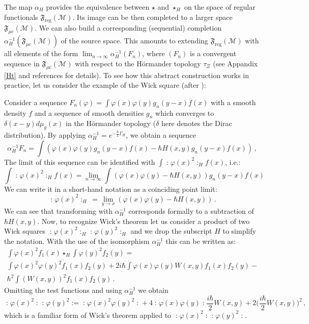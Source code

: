 \documentclass[12pt]{article}
\newcommand{\F}{\mathfrak{F}}
\newcommand{\Mcal}{\mathcal{M}}
\newcommand{\reg}{\mathrm{reg}}
\newcommand{\mc}{{\mu\mathrm{c}}}
\newcommand{\al}{\alpha}
\newcommand{\ph}{\varphi}
\newcommand{\1}{\mathds{1}}                         %
\begin{document}
{{The map $\al_H$ provides the equivalence between $\star$ and $\star_H$ on the space of regular functionals $\F_\reg(\Mcal)$. Its image can be then completed to a larger space $\F_\mc(\Mcal)$. We can also build a corresponding (sequential) completion $\al_H^{-1}(\F_\mc(\Mcal))$ of the source space. This amounts to extending  $\F_\reg(\Mcal)$ with all elements of the form $\lim_{n\rightarrow \infty}\al_H^{-1}(F_n)$, where $(F_n)$ is a convergent sequence in $\F_\mc(\Mcal)$ with respect to the H\"ormander topology $\tau_\Xi$ (see Appandix \ref{Ht} and references \cite{BDF,BaerF,Hoer1} for details). To see how this abstract construction works in practice, let us consider the example of the Wick square (after \cite{FR12}):
 \begin{exa}\label{Wick}
Consider a sequence $F_n(\ph)=\int \ph(x)\ph(y)g_n(y-x)f(x)$ with a smooth density $f$ and a sequence of smooth densities $g_n$ which converges to $\delta(x-y) d\mu_g(x)$ in the H\"ormander topology ($\delta$ here denotes the Dirac distribution). By applying $\al_H^{-1}=e^{-\tfrac{\hbar}{2}\Gamma_H}$, we obtain a sequence 
\[
\al_H^{-1}F_n= \int (\ph(x)\ph(y)g_n(y-x)f(x)-\hbar H(x,y)g_n(y-x)f(x))\,,
\]
The limit of this sequence can be identified with $\int \mathopen:\ph(x)^2\mathclose:_Hf(x)$, i.e.:
\[
\int \mathopen:\ph(x)^2\mathclose:_Hf(x)=\lim_{n\rightarrow\infty}\int (\ph(x)\ph(y)-\hbar H(x,y))g_n(y-x)f(x)
\]
We can write it in a short-hand notation as a coinciding point limit:
\[
\mathopen:\ph(x)^2\mathclose:_H\,=\lim_{y\rightarrow x}(\ph(x)\ph(y)-\hbar H(x,y))\,.
\]
 We can see that transforming with $\al_H^{-1}$ corresponds formally to a subtraction of $\hbar H(x,y)$.
Now, to recognize Wick's theorem let us consider a product of two Wick squares $ \mathopen:\ph(x)^2\mathclose:_H \mathopen:\ph(y)^2\mathclose:_H$  and we drop the subscript $H$ to simplify the notation. With the use of the isomorphism $\al_H^{-1}$ this can be written as:
\begin{multline*}
\int \ph(x)^2 f_1(x)\star_H\int \ph(y)^2 f_2(y)=\\
\int \ph(x)^2 \ph(y)^2f_1(x) f_2(y)+2i\hbar \int \ph(x) \ph(y)W(x,y)f_1(x) f_2(y)-\\
\hbar^2\int (W(x,y))^2f_1(x) f_2(y)\,.
\end{multline*}
Omitting the test functions and using $\al_H^{-1}$ we obtain
\[
\mathopen:\ph(x)^2\mathclose:\mathopen:\ph(y)^2\mathclose:=\mathopen:\ph(x)^2 \ph(y)^2\mathclose:+4 \mathopen:\ph(x) \ph(y)\mathclose:\frac{i\hbar}{2}W(x,y)+2\Big(\frac{i\hbar}{2}W(x,y)\Big)^2\,,
\]
which is a familiar form of Wick's theorem applied to $\mathopen:\ph(x)^2\mathclose:\mathopen:\ph(y)^2\mathclose:$.

\end{exa}}}
\end{document}
